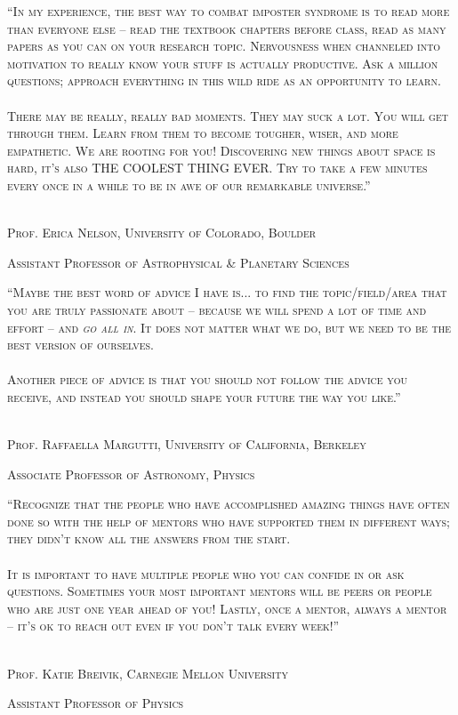 \documentclass[12pt]{article}
\begin{document}
\noindent \textsc{``In my experience, the best way to combat imposter syndrome is to read more than everyone else -- read the textbook chapters before class, read as many papers as you can on your research topic. Nervousness when channeled into motivation to really know your stuff is actually productive. Ask a million questions; approach everything in this wild ride as an opportunity to learn. \\
\\
There may be really, really bad moments. They may suck a lot. You will get through them. Learn from them to become tougher, wiser, and more empathetic. We are rooting for you! Discovering new things about space is hard, it's also THE COOLEST THING EVER. Try to take a few minutes every once in a while to be in awe of our remarkable universe.''}
\\
\\
\strut\hfill \textemdash \textsc{Prof. Erica Nelson, University of Colorado, Boulder}\\
\strut \hfill \footnotesize{\textsc{Assistant Professor of Astrophysical \& Planetary Sciences}}
\normalsize



\pagebreak
\strut \vspace{150pt}

\noindent \textsc{``Maybe the best word of advice I have is... to find the topic/field/area that you are truly passionate about -- because we will spend a lot of time and effort -- and \textsl{go all in}. It does not matter what we do, but we need to be the best version of ourselves.\\
\\
Another piece of advice is that you should not follow the advice you receive, and instead you should shape your future the way you like.''}
\\
\\
\strut\hfill \textemdash \textsc{Prof. Raffaella Margutti, University of California, Berkeley}\\
\strut \hfill \footnotesize{\textsc{Associate Professor of Astronomy, Physics}}
\normalsize




\pagebreak
\strut \vspace{150pt}

\noindent \textsc{``Recognize that the people who have accomplished amazing things have often done so with the help of mentors who have supported them in different ways; they didn't know all the answers from the start. 
\\
\\
It is important to have multiple people who you can confide in or ask questions. Sometimes your most important mentors will be peers or people who are just one year ahead of you! Lastly, once a mentor, always a mentor -- it's ok to reach out even if you don't talk every week!''}
\\
\\
\strut\hfill \textemdash \textsc{Prof. Katie Breivik, Carnegie Mellon University}\\
\strut \hfill \footnotesize{\textsc{Assistant Professor of Physics}}
\normalsize
\end{document}
